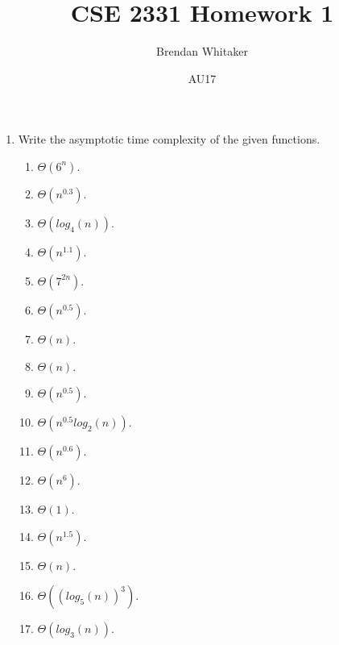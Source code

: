 \documentclass[10pt,oneside,reqno]{amsart}
\theoremstyle{plain}
\theoremstyle{definition}
\begin{document}
\title{CSE 2331 Homework 1}

\date{AU17}

\author[Brendan Whitaker]{Brendan Whitaker}

\maketitle

\begin{enumerate}[label=\arabic*.]

\item Write the asymptotic time complexity of the given functions. 

\begin{enumerate}

\item $\Theta (6^n)$. 

\item $\Theta (n^{0.3})$. 

\item $\Theta (log_4(n))$. 

\item $\Theta (n^{1.1})$. 

\item $\Theta (7^{2n})$. 

\item $\Theta (n^{0.5})$. 

\item $\Theta (n)$. 

\item $\Theta (n)$. 

\item $\Theta (n^{0.5})$. 

\item $\Theta (n^{0.5}log_2(n))$. 

\item $\Theta (n^{0.6})$. 

\item $\Theta (n^6)$. 

\item $\Theta (1)$. 

\item $\Theta (n^{1.5})$. 

\item $\Theta (n)$. 

\item $\Theta ((log_5(n))^3)$. 

\item $\Theta (log_3(n))$. 


\end{enumerate}
\end{enumerate}
\end{document}
